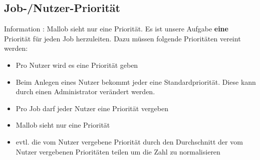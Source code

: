 
\subsection{Job-/Nutzer-Priorität}
Information : Mallob sieht nur eine Priorität. Es ist unsere Aufgabe \textbf{eine} Priorität für jeden Job herzuleiten. Dazu müssen folgende Prioritäten vereint werden: 
\begin{itemize}
    \item Pro Nutzer wird es eine Priorität geben 
    \item Beim Anlegen eines Nutzer bekommt jeder eine Standardpriorität. Diese kann durch einen Administrator verändert werden.
    \item Pro Job darf jeder Nutzer eine Priorität vergeben
    \item Mallob sieht nur eine Priorität
    \item evtl. die vom Nutzer vergebene Priorität durch den Durchschnitt der vom Nutzer vergebenen Prioritäten teilen um die Zahl zu normalisieren
\end{itemize}
